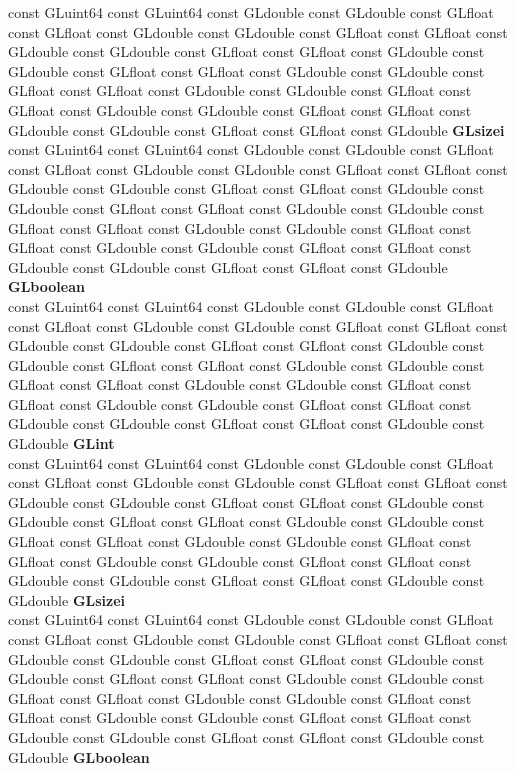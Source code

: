 \begin{DoxyCompactItemize}
\begin{tabbing}
\>const GLuint64 const GLuint64 const GLdouble const GLdouble const GLfloat const GLfloat const GLdouble const GLdouble const GLfloat const GLfloat const GLdouble const GLdouble const GLfloat const GLfloat const GLdouble const GLdouble const GLfloat const GLfloat const GLdouble const GLdouble const GLfloat const GLfloat const GLdouble const GLdouble const GLfloat const GLfloat const GLdouble const GLdouble const GLfloat const GLfloat const GLdouble const GLdouble const GLfloat const GLfloat const GLdouble {\bfseries GLsizei}\\
\>const GLuint64 const GLuint64 const GLdouble const GLdouble const GLfloat const GLfloat const GLdouble const GLdouble const GLfloat const GLfloat const GLdouble const GLdouble const GLfloat const GLfloat const GLdouble const GLdouble const GLfloat const GLfloat const GLdouble const GLdouble const GLfloat const GLfloat const GLdouble const GLdouble const GLfloat const GLfloat const GLdouble const GLdouble const GLfloat const GLfloat const GLdouble const GLdouble const GLfloat const GLfloat const GLdouble {\bfseries GLboolean}\\
\>const GLuint64 const GLuint64 const GLdouble const GLdouble const GLfloat const GLfloat const GLdouble const GLdouble const GLfloat const GLfloat const GLdouble const GLdouble const GLfloat const GLfloat const GLdouble const GLdouble const GLfloat const GLfloat const GLdouble const GLdouble const GLfloat const GLfloat const GLdouble const GLdouble const GLfloat const GLfloat const GLdouble const GLdouble const GLfloat const GLfloat const GLdouble const GLdouble const GLfloat const GLfloat const GLdouble const GLdouble {\bfseries GLint}\\
\>const GLuint64 const GLuint64 const GLdouble const GLdouble const GLfloat const GLfloat const GLdouble const GLdouble const GLfloat const GLfloat const GLdouble const GLdouble const GLfloat const GLfloat const GLdouble const GLdouble const GLfloat const GLfloat const GLdouble const GLdouble const GLfloat const GLfloat const GLdouble const GLdouble const GLfloat const GLfloat const GLdouble const GLdouble const GLfloat const GLfloat const GLdouble const GLdouble const GLfloat const GLfloat const GLdouble const GLdouble {\bfseries GLsizei}\\
\>const GLuint64 const GLuint64 const GLdouble const GLdouble const GLfloat const GLfloat const GLdouble const GLdouble const GLfloat const GLfloat const GLdouble const GLdouble const GLfloat const GLfloat const GLdouble const GLdouble const GLfloat const GLfloat const GLdouble const GLdouble const GLfloat const GLfloat const GLdouble const GLdouble const GLfloat const GLfloat const GLdouble const GLdouble const GLfloat const GLfloat const GLdouble const GLdouble const GLfloat const GLfloat const GLdouble const GLdouble {\bfseries GLboolean}\\

\end{tabbing}
\end{DoxyCompactItemize}
